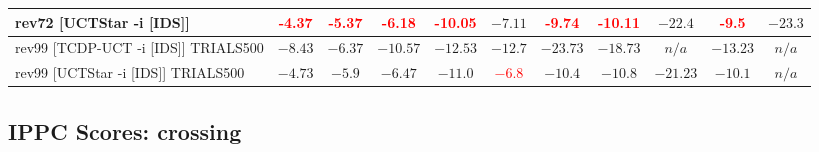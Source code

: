 \documentclass{article}
\begin{document}
\begin{tabular}{|l|r@{$\pm$}rr@{$\pm$}rr@{$\pm$}rr@{$\pm$}rr@{$\pm$}rr@{$\pm$}rr@{$\pm$}rr@{$\pm$}rr@{$\pm$}rr@{$\pm$}r|}
rev72 [UCTStar -i [IDS]]
& \multicolumn{2}{c}{\textbf{\textcolor{red}{-4.37}}}
& \multicolumn{2}{c}{\textbf{\textcolor{red}{-5.37}}}
& \multicolumn{2}{c}{\textbf{\textcolor{red}{-6.18}}}
& \multicolumn{2}{c}{\textbf{\textcolor{red}{-10.05}}}
& \multicolumn{2}{c}{$-7.11$}
& \multicolumn{2}{c}{\textbf{\textcolor{red}{-9.74}}}
& \multicolumn{2}{c}{\textbf{\textcolor{red}{-10.11}}}
& \multicolumn{2}{c}{$-22.4$}
& \multicolumn{2}{c}{\textbf{\textcolor{red}{-9.5}}}
& \multicolumn{2}{c|}{$-23.3$}
\\
\hline
rev99 [TCDP-UCT -i [IDS]] TRIALS500
& \multicolumn{2}{c}{$-8.43$}
& \multicolumn{2}{c}{\textbf{$-6.37$}}
& \multicolumn{2}{c}{$-10.57$}
& \multicolumn{2}{c}{$-12.53$}
& \multicolumn{2}{c}{$-12.7$}
& \multicolumn{2}{c}{$-23.73$}
& \multicolumn{2}{c}{$-18.73$}
& \multicolumn{2}{c}{\textbf{$n/a$}}
& \multicolumn{2}{c}{$-13.23$}
& \multicolumn{2}{c|}{\textbf{$n/a$}}
\\
rev99 [UCTStar -i [IDS]] TRIALS500
& \multicolumn{2}{c}{\textbf{$-4.73$}}
& \multicolumn{2}{c}{\textbf{$-5.9$}}
& \multicolumn{2}{c}{\textbf{$-6.47$}}
& \multicolumn{2}{c}{\textbf{$-11.0$}}
& \multicolumn{2}{c}{\textbf{\textcolor{red}{$-6.8$}}}
& \multicolumn{2}{c}{\textbf{$-10.4$}}
& \multicolumn{2}{c}{\textbf{$-10.8$}}
& \multicolumn{2}{c}{$-21.23$}
& \multicolumn{2}{c}{\textbf{$-10.1$}}
& \multicolumn{2}{c|}{\textbf{$n/a$}}
\\
\hline
\end{tabular}%

\bigskip

\subsection*{IPPC Scores: crossing}
\end{document}

